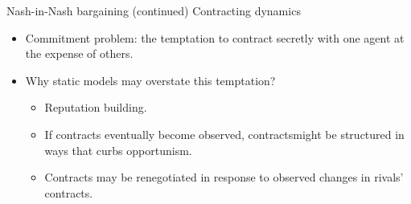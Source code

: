 \documentclass[aspectratio=169]{beamer}  %
\begin{document}
\begin{frame}{Nash-in-Nash bargaining (continued)}
    Contracting dynamics \vspace{.2cm}
    \begin{itemize}
        \item Commitment problem: the temptation to contract secretly with one agent at the expense of others. \vspace{.2cm}
        \item Why static models may overstate this temptation? \vspace{.2cm}
        \begin{itemize}
            \item Reputation building. \vspace{.2cm}
            \item If contracts eventually become observed, contractsmight be
            structured in ways that curbs opportunism. \vspace{.2cm}
            \item Contracts may be renegotiated in response to observed changes in rivals' contracts.
        \end{itemize}
    \end{itemize}
\end{frame}
\end{document}
